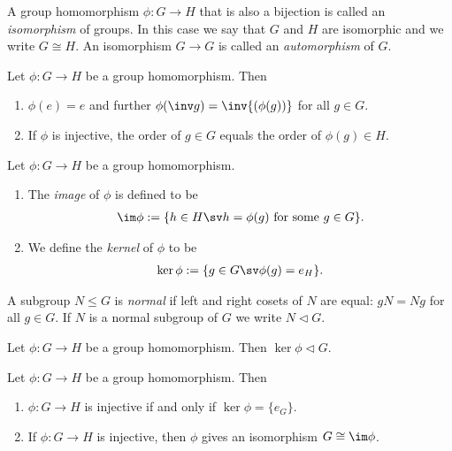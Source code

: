 \documentclass{article}
\begin{document}
\begin{definition}
    A group homomorphism $\phi:G\to H$ that is also a bijection is
    called an \emph{isomorphism} of groups. In this case we say that
    $G$ and $H$ are isomorphic and we write $G\cong H$. An
    isomorphism $G\to G$ is called an \emph{automorphism} of $G$.
\end{definition}

\setcounter{theorem}{4}
\begin{lemma}
    Let $\phi:G\to H$ be a group homomorphism. Then
    \begin{enumerate}
        \item $\phi(e)=e$ and further $\phi(\inv g)=\inv{(\phi(g))}$ for all $g\in G$.
        \item If $\phi$ is injective, the order of $g\in G$ equals the order of $\phi(g)\in H$.
    \end{enumerate}
\end{lemma}

\begin{definition}
    Let $\phi:G\to H$ be a group homomorphism.
    \begin{enumerate}
        \item The \emph{image} of $\phi$ is defined to be \begin{align*}
            \im\phi := \{h\in H \sv h=\phi(g)\text{ for some }g\in G\}.
        \end{align*}
        \item We define the \emph{kernel} of $\phi$ to be \begin{align*}
            \ker \phi := \{g\in G \sv \phi(g) = e_H\}.
        \end{align*}
    \end{enumerate}
\end{definition}

\begin{definition}
    A subgroup $N\leq G$ is \emph{normal} if left and right cosets
    of $N$ are equal: $gN=Ng$ for all $g\in G$. If $N$ is a normal
    subgroup of $G$ we write $N \triangleleft G$.
\end{definition}


\begin{proposition}
    Let $\phi:G\to H$ be a group homomorphism. Then $\ker\phi\triangleleft G$.
\end{proposition}

\begin{proposition}
    Let $\phi: G\to H$ be a group homomorphism. Then
    \begin{enumerate}
        \item $\phi:G\to H$ is injective if and only if $\ker\phi=\{e_G\}$.
        \item If $\phi:G\to H$ is injective, then $\phi$ gives an isomorphism $G\cong \im\phi$.
    \end{enumerate}
\end{proposition}
\end{document}
